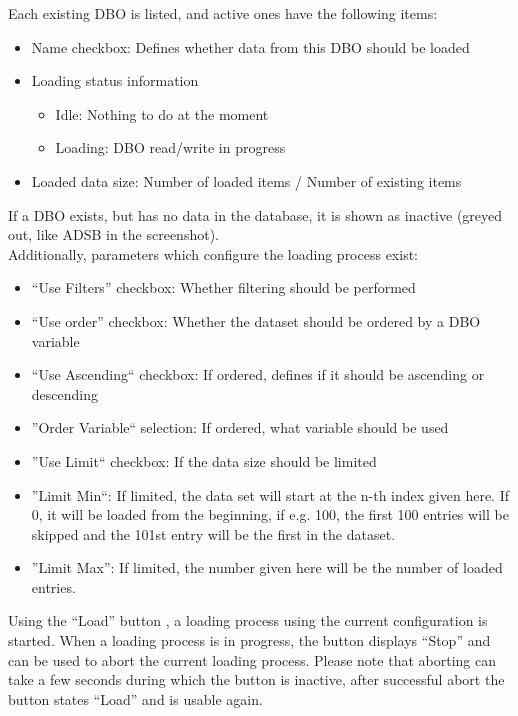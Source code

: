 Each existing DBO is listed, and active ones have the following items:

\begin{itemize}
 \item Name checkbox: Defines whether data from this DBO should be loaded
 \item Loading status information
  \begin{itemize}
  \item Idle: Nothing to do at the moment
  \item Loading: DBO read/write in progress
  \end{itemize}
 \item Loaded data size: Number of loaded items / Number of existing items
\end{itemize}

If a DBO exists, but has no data in the database, it is shown as inactive (greyed out, like ADSB in the screenshot).\\

Additionally, parameters which configure the loading process exist:

\begin{itemize}
 \item ``Use Filters'' checkbox: Whether filtering should be performed
 \item ``Use order'' checkbox: Whether the dataset should be ordered by a DBO variable
 \item ``Use Ascending`` checkbox: If ordered, defines if it should be ascending or descending
 \item ''Order Variable`` selection: If ordered, what variable should be used
 \item ''Use Limit`` checkbox: If the data size should be limited
 \item ''Limit Min``: If limited, the data set will start at the n-th index given here. If 0, it will be loaded from the beginning, if e.g. 100, the first 100 entries will be skipped and the 101st entry will be the first in the dataset.
\item ''Limit Max'': If limited, the number given here will be the number of loaded entries.
\end{itemize}

Using the ``Load'' button , a loading process using the current configuration is started. When a loading process is in progress, the button displays ``Stop'' and can be used to abort the current loading process. Please note that aborting can take a few seconds during which the button is inactive, after successful abort the button states ``Load'' and is usable again.

